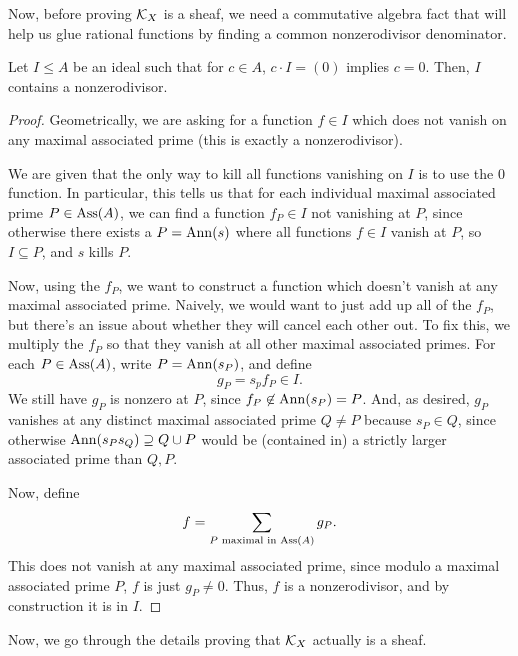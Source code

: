\documentclass[12pt]{article}
\begin{document}
Now, before proving $\mathcal{K}_X$ is a sheaf, we need a commutative algebra fact that will help us glue rational functions by finding a common nonzerodivisor denominator.
\begin{lem}
    Let $I\leq A$ be an ideal such that for $c\in A$, $c\cdot I = (0)$ implies $c=0$. Then, $I$ contains a nonzerodivisor.
\end{lem}
\begin{proof}
    Geometrically, we are asking for a function $f\in I$ which does not vanish on any maximal associated prime (this is exactly a nonzerodivisor).
    
    We are given that the only way to kill all functions vanishing on $I$ is to use the $0$ function. In particular, this tells us that for each individual maximal associated prime $P\in \operatorname{Ass}(A)$, we can find a function $f_P \in I$ not vanishing at $P$, since otherwise there exists a $P=\mathrm{Ann}(s)$ where all functions $f\in I$ vanish at $P$, so $I\subseteq P$, and $s$ kills $P$.
    
    Now, using the $f_P$, we want to construct a function which doesn't vanish at any maximal associated prime. Naively, we would want to just add up all of the $f_P$, but there's an issue about whether they will cancel each other out. To fix this, we multiply the $f_P$ so that they vanish at all other maximal associated primes. For each $P\in \operatorname{Ass}(A)$, write $P=\mathrm{Ann}(s_P)$, and define
    \[g_P = s_p f_P \in I.\]
    We still have $g_P$ is nonzero at $P$, since $f_P \not\in \mathrm{Ann}(s_P)=P$. And, as desired, $g_P$ vanishes at any distinct maximal associated prime $Q\neq P$ because $s_P\in Q$, since otherwise $\mathrm{Ann}(s_Ps_Q) \supseteq Q\cup P$ would be (contained in) a strictly larger associated prime than $Q,P$.
    
    Now, define
    \[f = \sum_{P \text{ maximal in $\operatorname{Ass}(A)$}} g_P.\]
    This does not vanish at any maximal associated prime, since modulo a maximal associated prime $P$, $f$ is just $g_P \neq 0$. Thus, $f$ is a nonzerodivisor, and by construction it is in $I$.
\end{proof}

Now, we go through the details proving that $\mathcal{K}_X$ actually is a sheaf.
\end{document}
